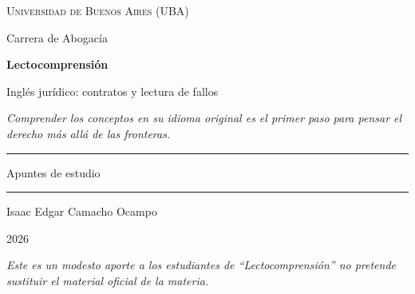 \documentclass[12pt,oneside]{book}
\newcommand{\universidad}{Universidad de Buenos Aires (UBA)}
\newcommand{\carrera}{Carrera de Abogacía}
\newcommand{\materia}{Lectocomprensión}
\newcommand{\titulo}{Inglés jurídico: contratos y lectura de fallos}
\newcommand{\autor}{Isaac Edgar Camacho Ocampo}
\newcommand{\anio}{2026}
\begin{document}
\begin{titlepage}

\thispagestyle{empty}

\begin{center}

\vspace*{1cm}

{\large \textsc{\universidad}}

\vspace{0.2cm}

{\large \carrera}

\vspace{3cm}

{\Huge \textbf{\materia}}

\vspace{1cm}

{\LARGE \titulo}

\vspace{0.8cm}

\textit{Comprender los conceptos en su idioma original es el primer paso para pensar el derecho más allá de las fronteras.}

\vspace{1.2cm}

\rule{0.70\textwidth}{0.5pt}

\vspace{0.5cm}

{\large Apuntes de estudio}

\vspace{0.5cm}

\rule{0.70\textwidth}{0.5pt}

\vfill

{\large \autor}

\vspace{0.3cm}

{\large \anio}

\end{center}

\vfill

\begin{flushleft}
\textit{Este es un modesto aporte a los estudiantes de ``Lectocomprensión'' no pretende sustituir el material oficial de la materia.}
\end{flushleft}

\end{titlepage}

\tableofcontents

\end{document}
